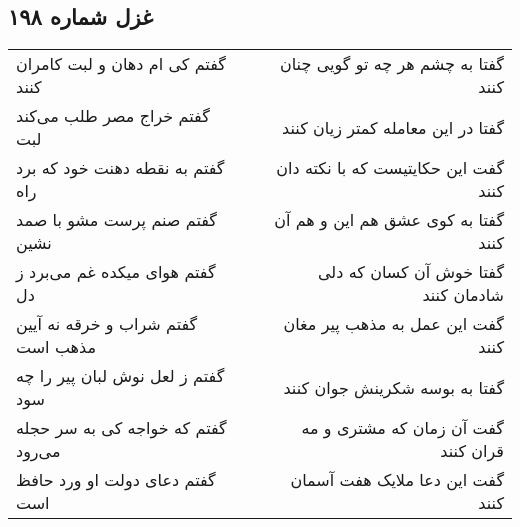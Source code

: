 \begin{center}
\section*{غزل شماره ۱۹۸}
\label{sec:sh198}
\begin{longtable}{l p{0.5cm} r}
گفتم کی ام دهان و لبت کامران کنند
&&
گفتا به چشم هر چه تو گویی چنان کنند
\\
گفتم خراج مصر طلب می‌کند لبت
&&
گفتا در این معامله کمتر زیان کنند
\\
گفتم به نقطه دهنت خود که برد راه
&&
گفت این حکایتیست که با نکته دان کنند
\\
گفتم صنم پرست مشو با صمد نشین
&&
گفتا به کوی عشق هم این و هم آن کنند
\\
گفتم هوای میکده غم می‌برد ز دل
&&
گفتا خوش آن کسان که دلی شادمان کنند
\\
گفتم شراب و خرقه نه آیین مذهب است
&&
گفت این عمل به مذهب پیر مغان کنند
\\
گفتم ز لعل نوش لبان پیر را چه سود
&&
گفتا به بوسه شکرینش جوان کنند
\\
گفتم که خواجه کی به سر حجله می‌رود
&&
گفت آن زمان که مشتری و مه قران کنند
\\
گفتم دعای دولت او ورد حافظ است
&&
گفت این دعا ملایک هفت آسمان کنند
\\
\end{longtable}
\end{center}
